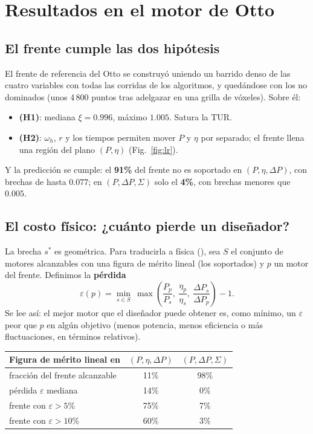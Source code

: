 \section{Resultados en el motor de Otto}
\label{sec:otto}

\subsection{El frente cumple las dos hipótesis}

El frente de referencia del Otto se construyó uniendo un barrido denso de las cuatro variables con
todas las corridas de los algoritmos, y quedándose con los no dominados (unos 4\,800 puntos tras
adelgazar en una grilla de vóxeles). Sobre él:
\begin{itemize}
\item \textbf{(H1)}: mediana $\xi = 0.996$, máximo $1.005$. Satura la TUR.
\item \textbf{(H2)}: $\omega_h$, $r$ y los tiempos permiten mover $P$ y $\eta$ por separado; el
  frente llena una región del plano $(P,\eta)$ (Fig.~\ref{fig:lr}).
\end{itemize}
Y la predicción se cumple: el \textbf{91\%} del frente no es soportado en $(P,\eta,\Delta P)$, con
brechas de hasta $0.077$; en $(P,\Delta P,\Sigma)$ solo el \textbf{4\%}, con brechas menores que
$0.005$.

\subsection{El costo físico: ¿cuánto pierde un diseñador?}

La brecha $s^*$ es geométrica. Para traducirla a física (), sea $S$ el
conjunto de motores alcanzables con una figura de mérito lineal (los soportados) y $p$ un motor del
frente. Definimos la \textbf{pérdida}
\begin{equation}
\varepsilon(p) = \min_{s\in S}\ \max\!\left(\frac{P_p}{P_s},\ \frac{\eta_p}{\eta_s},\
\frac{\Delta P_s}{\Delta P_p}\right) - 1 .
\end{equation}
Se lee así: el mejor motor que el diseñador puede obtener es, como mínimo, un $\varepsilon$ peor que
$p$ en algún objetivo (menos potencia, menos eficiencia o más fluctuaciones, en términos relativos).

\begin{center}
\begin{tabular}{lcc}
\toprule
Figura de mérito lineal en & $(P,\eta,\Delta P)$ & $(P,\Delta P,\Sigma)$\\
\midrule
fracción del frente alcanzable & 11\% & 98\% \\
pérdida $\varepsilon$ mediana & 14\% & 0\% \\
frente con $\varepsilon > 5\%$ & 75\% & 7\% \\
frente con $\varepsilon > 10\%$ & 60\% & 3\% \\
\bottomrule
\end{tabular}
\end{center}

